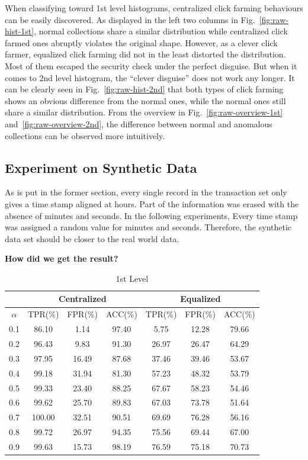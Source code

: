 \documentclass[a4paper]{IEEEtran}
\begin{document}
			When classifying toward 1st level histograms, centralized click farming behaviours can be easily discovered. As displayed in the left two columns in Fig.~\ref{fig:raw-hist-1st}, normal collections share a similar distribution while centralized click farmed ones abruptly violates the original shape. However, as a clever click farmer, equalized click farming did not in the least distorted the distribution. Most of them escaped the security check under the perfect disguise.
			But when it comes to 2nd level histogram, the ``clever disguise'' does not work any longer. It can be clearly seen in Fig.~\ref{fig:raw-hist-2nd} that both types of click farming shows an obvious difference from the normal ones, while the normal ones still share a similar distribution.
			From the overview in Fig.~\ref{fig:raw-overview-1st} and~\ref{fig:raw-overview-2nd}, the difference between normal and anomalous collections can be observed more intuitively.
			
		\subsection{Experiment on Synthetic Data}
			As is put in the former section, every single record in the transaction set only gives a time stamp aligned at hours. Part of the information was erased with the absence of minutes and seconds. In the following experiments, Every time stamp was assigned a random value for minutes and seconds. Therefore, the synthetic data set should be closer to the real world data.
			
			\textbf{How did we get the result?}
			
			\begin{table}[!ht]
				\centering
				\caption{1st Level}
				\label{tab:syn-result-1st}
				\begin{tabular}{|c|c|c|c|c|c|c|}
					\hline
					& \multicolumn{3}{c|}{Centralized} & \multicolumn{3}{c|}{Equalized}\\
					\hline
					$\alpha$ & TPR(\%) & FPR(\%) & ACC(\%) & TPR(\%) & FPR(\%) & ACC(\%) \\ 
					\hline
					0.1 & 86.10 & 1.14 & 97.40 & 5.75 & 12.28 & 79.66 \\ 
					\hline
					0.2 & 96.43 & 9.83 & 91.30 & 26.97 & 26.47 & 64.29 \\ 
					\hline
					0.3 & 97.95 & 16.49 & 87.68 & 37.46 & 39.46 & 53.67 \\ 
					\hline
					0.4 & 99.18 & 31.94 & 81.30 & 57.23 & 48.32 & 53.79 \\ 
					\hline
					0.5 & 99.33 & 23.40 & 88.25 & 67.67 & 58.23 & 54.46 \\ 
					\hline
					0.6 & 99.62 & 25.70 & 89.83 & 67.03 & 73.78 & 51.64 \\ 
					\hline
					0.7 & 100.00 & 32.51 & 90.51 & 69.69 & 76.28 & 56.16 \\ 
					\hline
					0.8 & 99.72 & 26.97 & 94.35 & 75.56 & 69.44 & 67.00 \\ 
					\hline
					0.9 & 99.63 & 15.73 & 98.19 & 76.59 & 75.18 & 70.73\\
					\hline
				\end{tabular} 
			\end{table}
			
\end{document}
